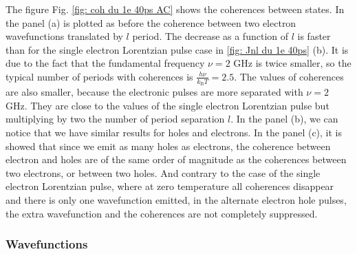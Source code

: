 The figure Fig. \ref{fig: coh du 1e 40ps AC} shows the coherences between states.
In the panel (a) is plotted as before the coherence between two electron wavefunctions translated by $l$ period.
The decrease as a function of $l$ is faster than for the single electron Lorentzian pulse case in \ref{fig: Jnl du 1e 40ps} (b).
It is due to the fact that the fundamental frequency $\nu = 2$ GHz is twice smaller, so the typical number of periods with coherences is $\frac{h\nu}{k_{\mathrm{B}}T} = 2.5$.
The values of coherences are also smaller, because the electronic pulses are more separated with $\nu = 2$ GHz.
They are close to the values of the single electron Lorentzian pulse but multiplying by two the number of period separation $l$.
In the panel (b), we can notice that we have similar results for holes and electrons.
In the panel (c), it is showed that since we emit as many holes as electrons, the coherence between electron and holes are of the same order of magnitude as the coherences between two electrons, or between two holes.
And contrary to the case of the single electron Lorentzian pulse, where at zero temperature all coherences disappear and there is only one wavefunction emitted, in the alternate electron hole pulses, the extra wavefunction and the coherences  are not completely suppressed.


\subsubsection*{Wavefunctions}

